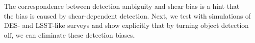 \documentclass[fleqn,useAMS,usenatbib]{mnras}
\begin{document}
The correspondence between detection ambiguity and shear bias is a hint that
the bias is caused by shear-dependent detection. Next, we test with simulations
of DES- and LSST-like surveys and show explicitly that by turning object
detection off, we can eliminate these detection biases.

%
%
%
%
%
\end{document}
